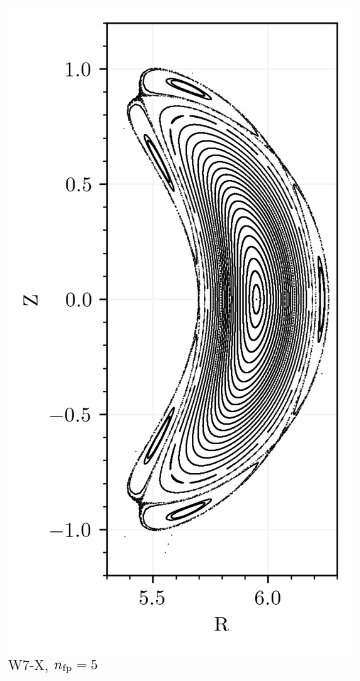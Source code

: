 \begin{figure}[H]
    \centering
    \begin{subfigure}{0.32\textwidth}
        \centering
        \includegraphics[width=\textwidth]{images/theory/w7x.png}
        \caption{W7-X, $n_\text{fp} = 5$}
        \label{fig:w7x-default}
    \end{subfigure}
    \hfill
    \begin{subfigure}{0.32\textwidth}

\end{subfigure}
\end{figure}
